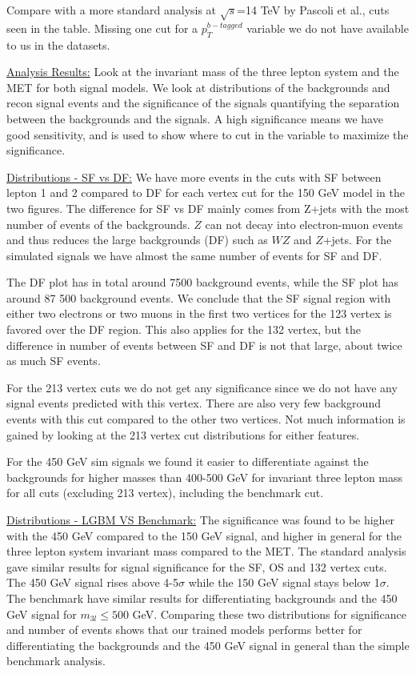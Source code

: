 \documentclass[a4paper, american, 12pt]{report}
\begin{document}
	Compare with a more standard analysis at $\sqrt{s}$=14 TeV by Pascoli et al., cuts seen in the table. Missing one cut for a $p_T^{b-tagged}$ variable we do not have available to us in the datasets.
	
	
	\underline{Analysis Results:}
	Look at the invariant mass of the three lepton system and the MET for both signal models. We look at distributions of the backgrounds and recon signal events and the significance of the signals quantifying the separation between the backgrounds and the signals. A high significance means we have good sensitivity, and is used to show where to cut in the variable to maximize the significance.
	
	
	\underline{Distributions - SF vs DF:}
	 We have more events in the cuts with SF between lepton 1 and 2 compared to DF for each vertex cut for the 150 GeV model in the two figures. The difference for SF vs DF mainly comes from Z+jets with the most number of events of the backgrounds. $Z$ can not decay into electron-muon events and thus reduces the large backgrounds (DF) such as $W$$Z$ and $Z$+jets. For the simulated signals we have almost the same number of events for SF and DF. 
	 
	 The DF plot has in total around 7500 background events, while the SF plot has around 87 500 background events. We conclude that the SF signal region with either two electrons or two muons in the first two vertices for the 123 vertex is favored over the DF region. This also applies for the 132 vertex, but the difference in number of events between SF and DF is not that large, about twice as much SF events.
	
	For the 213 vertex cuts we do not get any significance since we do not have any signal events predicted with this vertex. There are also very few background events with this cut compared to the other two vertices. Not much information is gained by looking at the 213 vertex cut distributions for either features.
	
	For the 450 GeV sim signals we found it easier to differentiate against the backgrounds for higher masses than 400-500 GeV for invariant three lepton mass for all cuts (excluding 213 vertex), including the benchmark cut.
	
	
	\underline{Distributions - LGBM VS Benchmark:}
	The significance was found to be higher with the 450 GeV compared to the 150 GeV signal, and higher in general for the three lepton system invariant mass compared to the MET. The standard analysis gave similar results for signal significance for the SF, OS and 132 vertex cuts. The 450 GeV signal rises above 4-5$\sigma$ while the 150 GeV signal stays below 1$\sigma$. The benchmark have similar results for differentiating backgrounds and the 450 GeV signal for $m_{3l}\leq500$ GeV. Comparing these two distributions for significance and number of events shows that our trained models performs better for differentiating the backgrounds and the 450 GeV signal in general than the simple benchmark analysis.
	
\end{document}
